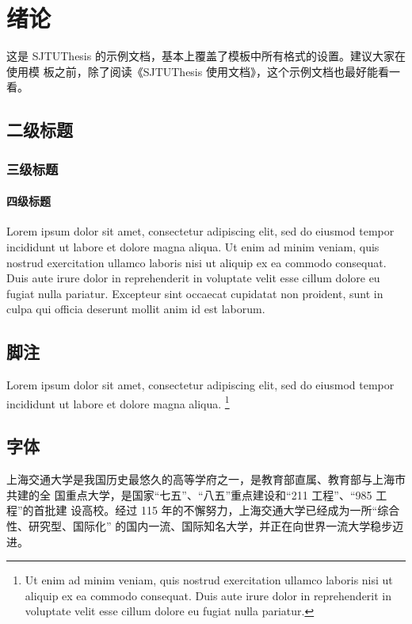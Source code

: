 
\chapter{绪论}

这是 SJTUThesis 的示例文档，基本上覆盖了模板中所有格式的设置。建议大家在使用模
板之前，除了阅读《SJTUThesis 使用文档》，这个示例文档也最好能看一看。




\section{二级标题}

\subsection{三级标题}

\subsubsection{四级标题}

Lorem ipsum dolor sit amet, consectetur adipiscing elit, sed do eiusmod tempor
incididunt ut labore et dolore magna aliqua. Ut enim ad minim veniam, quis
nostrud exercitation ullamco laboris nisi ut aliquip ex ea commodo consequat.
Duis aute irure dolor in reprehenderit in voluptate velit esse cillum dolore eu
fugiat nulla pariatur. Excepteur sint occaecat cupidatat non proident, sunt in
culpa qui officia deserunt mollit anim id est laborum.

\section{脚注}

Lorem ipsum dolor sit amet, consectetur adipiscing elit, sed do eiusmod tempor
incididunt ut labore et dolore magna aliqua. \footnote{Ut enim ad minim veniam,
quis nostrud exercitation ullamco laboris nisi ut aliquip ex ea commodo
consequat. Duis aute irure dolor in reprehenderit in voluptate velit esse cillum
dolore eu fugiat nulla pariatur.}

\section{字体}


上海交通大学是我国历史最悠久的高等学府之一，是教育部直属、教育部与上海市共建的全
国重点大学，是国家“七五”、“八五”重点建设和“211 工程”、“985 工程”的首批建
设高校。经过 115 年的不懈努力，上海交通大学已经成为一所“综合性、研究型、国际化”
的国内一流、国际知名大学，并正在向世界一流大学稳步迈进。 

